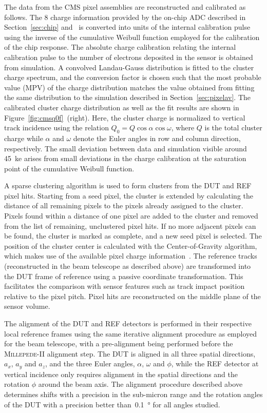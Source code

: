 \documentclass[a4paper,11pt]{article}
\begin{document}
The data from the CMS pixel assemblies are reconstructed and calibrated as follows.
The \SI{8}{\bit} charge information provided by the on-chip ADC described in Section~\ref{sec:chip} and~\cite{Kästli201388} is converted into units of the internal calibration pulse using the inverse of the cumulative Weibull function employed for the calibration of the chip response.
The absolute charge calibration relating the internal calibration pulse to the number of electrons deposited in the sensor is obtained from simulation.
A convolved Landau-Gauss distribution is fitted to the cluster charge spectrum, and the conversion factor is chosen such that the most probable value (MPV) of the charge distribution matches the value obtained from fitting the same distribution to the simulation described in Section~\ref{sec:pixelav}.
The calibrated cluster charge distribution as well as the fit results are shown in Figure~\ref{fig:cmsq0f}~(right).
Here, the cluster charge is normalized to vertical track incidence using the relation $Q_0 = Q\cos{\alpha}\cos{\omega}$, where $Q$ is the total cluster charge while $\alpha$ and $\omega$ denote the Euler angles in row and column direction, respectively.
The small deviation between data and simulation visible around \SI{45}{ke} arises from small deviations in the charge calibration at the saturation point of the cumulative Weibull function.

A sparse clustering algorithm is used to form clusters from the DUT and REF pixel hits.
Starting from a seed pixel, the cluster is extended by calculating the distance of all remaining pixels to the pixels already assigned to the cluster.
Pixels found within a distance of one pixel are added to the cluster and removed from the list of remaining, unclustered pixel hits.
If no more adjacent pixels can be found, the cluster is marked as complete, and a new seed pixel is selected.
The position of the cluster center is calculated with the Center-of-Gravity algorithm, which makes use of the available pixel charge information~\cite{cog}.
The reference tracks (reconstructed in the beam telescope as described above) are transformed into the DUT frame of reference using a passive coordinate transformation.
This facilitates the comparison with sensor features such as track impact position relative to the pixel pitch.
Pixel hits are reconstructed on the middle plane of the sensor volume.

The alignment of the DUT and REF detectors is performed in their respective local reference frames using the same iterative alignment procedure as employed for the beam telescope, with a pre-alignment being performed before the \textsc{Millepede-II} alignment step.
The DUT is aligned in all three spatial directions, $a_x$, $a_y$ and $a_z$, and the three Euler angles, $\alpha$, $\omega$ and $\phi$, while the REF detector at vertical incidence only requires alignment in the spatial directions and the rotation $\phi$ around the beam axis.
The alignment procedure described above determines shifts with a precision in the sub-micron range and the rotation angles of the DUT with a precision better than~\SI{0.1}{\degree} for all angles studied.
\end{document}
